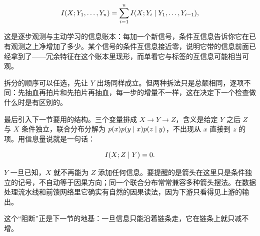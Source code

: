 \[
I(X;Y_1,\ldots,Y_n)=\sum_{i=1}^{n} I(X;Y_i\mid Y_1,\ldots,Y_{i-1}),
\]

这是逐步观测与主动学习的信息账本：每加一个新信号，条件互信息告诉你它在已有观测之上净增加了多少。某个信号的条件互信息接近零，说明它带的信息前面已经拿到了——冗余特征在这个账本里现形，而单看它与标签的互信息可能相当可观。

拆分的顺序可以任选，先让 \(Y\) 出场同样成立。但两种拆法只是总额相同，逐项不同：先抽血再拍片和先拍片再抽血，每一步的增量不一样，这在决定下一个检查做什么时是有区别的。

最后引入下一节要用的结构。三个变量排成 \(X\to Y\to Z\)，含义是给定 \(Y\) 之后 \(Z\) 与 \(X\) 条件独立，联合分布分解为 \(p(x)p(y\mid x)p(z\mid y)\)，不出现从 \(x\) 直接到 \(z\) 的项。用信息量说就是一句话：

\[
I(X;Z\mid Y)=0.
\]

\(Y\) 一旦已知，\(X\) 就不再能为 \(Z\) 添加任何信息。要提醒的是箭头在这里只是条件独立的记号，不自动等于因果方向；同一个联合分布常常兼容多种箭头摆法。在数据处理流水线和前馈网络里它确实有自然的因果读法，因为下游只看得见上游的输出。

这个``阻断''正是下一节的地基：一旦信息只能沿着链条走，它在链条上就只减不增。
